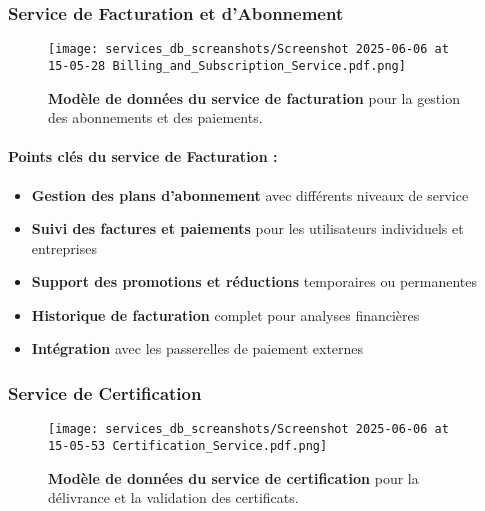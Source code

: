 \subsubsection{Service de Facturation et d'Abonnement}
\begin{figure}[h!]
  \centering
  \texttt{[image: services\_db\_screanshots/Screenshot 2025-06-06 at 15-05-28 Billing\_and\_Subscription\_Service.pdf.png]}
  \caption{\textbf{Modèle de données du service de facturation} pour la gestion des abonnements et des paiements.}
  \label{fig:billing_service}
\end{figure}
\vspace{-10pt}
\small
\paragraph{Points clés du service de Facturation :}
\begin{itemize}[leftmargin=*,noitemsep,topsep=0pt]
  \item \textbf{Gestion des plans d'abonnement} avec différents niveaux de service
  \item \textbf{Suivi des factures et paiements} pour les utilisateurs individuels et entreprises
  \item \textbf{Support des promotions et réductions} temporaires ou permanentes
  \item \textbf{Historique de facturation} complet pour analyses financières
  \item \textbf{Intégration} avec les passerelles de paiement externes
\end{itemize}
\normalsize
\newpage

\subsubsection{Service de Certification}
\begin{figure}[h!]
  \centering
  \texttt{[image: services\_db\_screanshots/Screenshot 2025-06-06 at 15-05-53 Certification\_Service.pdf.png]}
  \caption{\textbf{Modèle de données du service de certification} pour la délivrance et la validation des certificats.}
  \label{fig:certification_service}
\end{figure}
\vspace{-10pt}
\small
